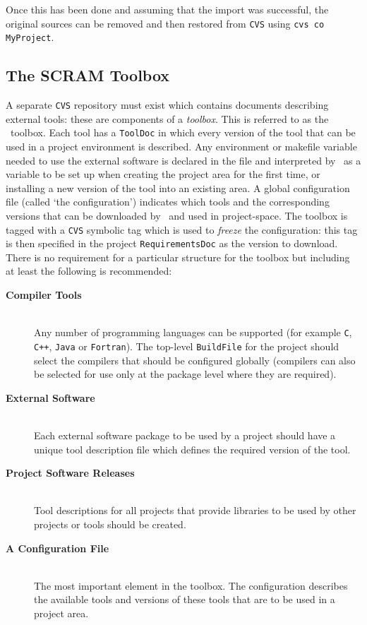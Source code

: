 \ni Once this has been done and assuming that the import was
successful, the original sources can be removed and then restored from \texttt{CVS}
using \texttt{cvs co MyProject}.

\subsection{The SCRAM Toolbox}\label{sec:toolboxrep}
A separate \texttt{CVS} repository must exist which contains 
documents describing external tools: these are components of a {\em toolbox}. 
This is referred to as the \scram\ toolbox.
Each tool has a \texttt{ToolDoc} in which every
version of the tool that can be used in a project environment is
described. Any environment or makefile variable needed to use the
external software is declared in the file and interpreted by \scram\ as
a variable to be set up when creating the project area for the first
time, or installing a new version of the tool into an existing area.
A global configuration file (called
`the configuration') indicates which tools and the corresponding versions that can
be downloaded by \scram\ and used in project-space. The toolbox is
tagged with a \texttt{CVS} symbolic tag which is used to \textit{freeze} the
configuration: this tag is then specified in the project
\texttt{RequirementsDoc} as the version to download.
There is no requirement for a particular structure for the toolbox 
but including at least the following is recommended:

\begin{description}
\item[\textbf{Compiler Tools}]\mbox{}\\
  Any number of programming languages can be supported (for example \texttt{C},
  \texttt{C++}, \texttt{Java} or \texttt{Fortran}). The top-level
  \texttt{BuildFile} for the project should select the compilers that should
  be configured globally (compilers can also be selected for use only at
  the package level where they are required).
\item[\textbf{External Software}]\mbox{}\\
  Each external software package to be used by a project should have a
  unique tool description file which defines the required version of
  the tool.
\item[\textbf{Project Software Releases}]\mbox{}\\
  Tool descriptions for all projects that provide libraries to be used
  by other projects or tools should be created.
\item[\textbf{A Configuration File}]\mbox{}\\
  The most important element in the toolbox. The 
  configuration describes the available tools and 
  versions of these tools that are to be used in a
  project area.
\end{description}

